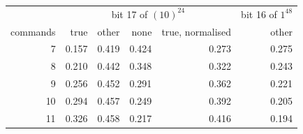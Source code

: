 \begin{tabular}{rrrrrr}
\toprule
 & \multicolumn{4}{c}{bit 17 of $(10)^{24}$} & bit 16 of $1^{48}$ \\
commands & true & other & none & true, normalised & other \\
\midrule
7 & 0.157 & 0.419 & 0.424 & 0.273 & 0.275 \\
8 & 0.210 & 0.442 & 0.348 & 0.322 & 0.243 \\
9 & 0.256 & 0.452 & 0.291 & 0.362 & 0.221 \\
10 & 0.294 & 0.457 & 0.249 & 0.392 & 0.205 \\
11 & 0.326 & 0.458 & 0.217 & 0.416 & 0.194 \\
\bottomrule
\end{tabular}
